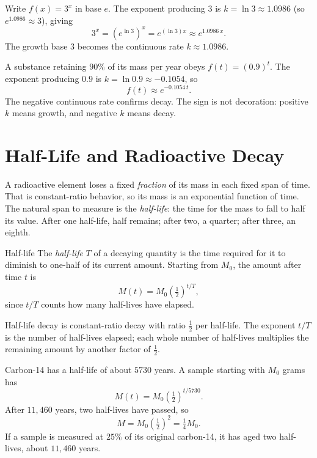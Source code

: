 \documentclass[12pt]{book}
\begin{document}
\begin{example}
Write $f(x)=3^{x}$ in base $e$. The exponent producing $3$ is $k=\ln 3\approx1.0986$
(so $e^{1.0986}\approx3$), giving
\[
3^{x}=\left(e^{\ln 3}\right)^{x}=e^{(\ln 3)x}\approx e^{1.0986\,x}.
\]
The growth base $3$ becomes the continuous rate $k\approx1.0986$.
\end{example}

\begin{example}
A substance retaining $90\%$ of its mass per year obeys $f(t)=(0.9)^{t}$. The exponent
producing $0.9$ is $k=\ln 0.9\approx-0.1054$, so
\[
f(t)\approx e^{-0.1054\,t}.
\]
The negative continuous rate confirms decay. The sign is not decoration: positive $k$
means growth, and negative $k$ means decay.
\end{example}

\newpage
\section{Half-Life and Radioactive Decay}

A radioactive element loses a fixed \emph{fraction} of its mass in each fixed span of
time. That is constant-ratio behavior, so its mass is an exponential function of time.
The natural span to measure is the \emph{half-life}: the time for the mass to fall to
half its value. After one half-life, half remains; after two, a quarter; after three, an
eighth.

\begin{definition}{Half-life}
The \emph{half-life} $T$ of a decaying quantity is the time required for it to diminish
to one-half of its current amount. Starting from $M_0$, the amount after time $t$ is
\[
M(t)=M_0\left(\tfrac12\right)^{t/T},
\]
since $t/T$ counts how many half-lives have elapsed.
\end{definition}

\begin{keyidea}
Half-life decay is constant-ratio decay with ratio $\tfrac12$ per half-life. The
exponent $t/T$ is the number of half-lives elapsed; each whole number of half-lives
multiplies the remaining amount by another factor of $\tfrac12$.
\end{keyidea}

\begin{example}
Carbon-14 has a half-life of about $5730$ years. A sample starting with $M_0$ grams has
\[
M(t)=M_0\left(\tfrac12\right)^{t/5730}.
\]
After $11{,}460$ years, two half-lives have passed, so
\[
M=M_0\left(\tfrac12\right)^{2}=\tfrac14 M_0.
\]
If a sample is measured at $25\%$ of its original carbon-14, it has aged two
half-lives, about $11{,}460$ years.
\end{example}
\end{document}
